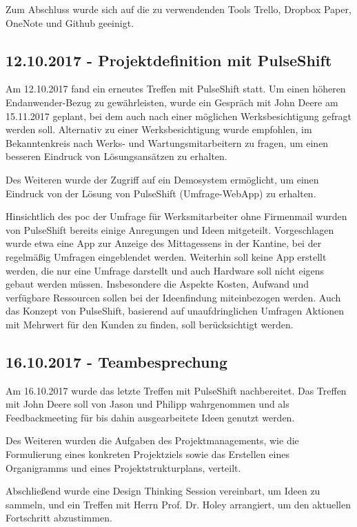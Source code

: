 Zum Abschluss wurde sich auf die zu verwendenden Tools Trello, Dropbox Paper, OneNote und Github geeinigt.

\subsection{12.10.2017 - Projektdefinition mit PulseShift}
Am 12.10.2017 fand ein erneutes Treffen mit PulseShift statt. Um einen höheren Endanwender-Bezug zu gewährleisten, wurde ein Gespräch mit John Deere am 15.11.2017 geplant, bei dem auch nach einer möglichen Werksbesichtigung gefragt werden soll. Alternativ zu einer Werksbesichtigung wurde empfohlen, im Bekanntenkreis nach Werks- und Wartungsmitarbeitern zu fragen, um einen besseren Eindruck von Lösungsansätzen zu erhalten.

Des Weiteren wurde der Zugriff auf ein Demosystem ermöglicht, um einen Eindruck von der Lösung von PulseShift (Umfrage-WebApp) zu erhalten.

Hinsichtlich des \gls{poc} der Umfrage für Werksmitarbeiter ohne Firmenmail wurden von PulseShift bereits einige Anregungen und Ideen mitgeteilt. Vorgeschlagen wurde etwa eine App zur Anzeige des Mittagessens in der Kantine, bei der regelmäßig Umfragen eingeblendet werden. Weiterhin soll keine App erstellt werden, die nur eine Umfrage darstellt und auch Hardware soll nicht eigens gebaut werden müssen. Insbesondere die Aspekte Kosten, Aufwand und verfügbare Ressourcen sollen bei der Ideenfindung miteinbezogen werden. Auch das Konzept von PulseShift, basierend auf unaufdringlichen Umfragen Aktionen mit Mehrwert für den Kunden zu finden, soll berücksichtigt werden.

\subsection{16.10.2017 - Teambesprechung}
Am 16.10.2017 wurde das letzte Treffen mit PulseShift nachbereitet. Das Treffen mit John Deere soll von Jason und Philipp wahrgenommen und als Feedbackmeeting für bis dahin ausgearbeitete Ideen genutzt werden.

Des Weiteren wurden die Aufgaben des Projektmanagements, wie die Formulierung eines konkreten Projektziels sowie das Erstellen eines Organigramms und eines Projektstrukturplans, verteilt.

Abschließend wurde eine Design Thinking Session vereinbart, um Ideen zu sammeln, und ein Treffen mit Herrn Prof. Dr. Holey arrangiert, um den aktuellen Fortschritt abzustimmen.

